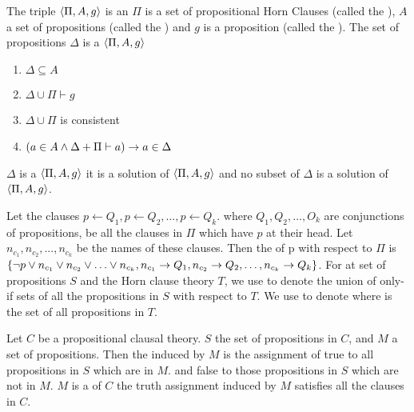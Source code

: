 \begin{defi}
The triple $\left\langle \Pi,A,g\right\rangle$ is an  \iffTx{} $\Pi$ is a set of propositional Horn Clauses (called the ), $A$ a set of propositions (called the ) and $g$ is a proposition (called the ). The set of propositions $\Delta$ is a  $\left\langle \Pi,A,g\right\rangle$ \iffTx{}
\begin{enumerate}
\item $\Delta\subseteq A$
\item $\Delta\cup\Pi\vdash g$
\item $\Delta\cup\Pi$ is consistent
\item $\left( a\in A \wedge \Delta+\Pi\vdash a\right)\rightarrow a\in\Delta$
\end{enumerate}
$\Delta$ is a  $\left\langle \Pi,A,g\right\rangle$ \iffTx{} it is a solution of $\left\langle \Pi,A,g\right\rangle$ and no subset of $\Delta$ is a solution of $\left\langle \Pi,A,g\right\rangle$.
\cite{conf/ijcai/Eshghi93}
\end{defi}

\begin{defi}
Let the clauses $p\leftarrow Q_1,p\leftarrow Q_2,\ldots,p\leftarrow Q_k$. where $Q_1,Q_2,\ldots,O_k$ are conjunctions of propositions, be all the clauses in $\Pi$ which have $p$ at their head. Let $n_{c_1},n_{c_2},...,n_{c_k}$ be the names of these clauses. Then the  of p with respect to $\Pi$ is $\left\{ \neg p\vee n_{c_1}\vee n_{c_2}\vee\ldots\vee n_{c_k},n_{c_1}\rightarrow Q_1,n_{c_2}\rightarrow Q_2,\ldots,n_{c_k}\rightarrow Q_k\right\}$. For at set of propositions $S$ and the Horn clause theory $T$, we use  to denote the union of only-if sets of all the propositions in $S$ with respect to $T$. We use  to denote  where  is the set of all propositions in $T$.
\cite{conf/ijcai/Eshghi93}
\end{defi}

\begin{defi}
Let $C$ be a propositional clausal theory. $S$ the set of propositions in $C$, and $M$ a set of propositions. Then the  induced by $M$ is the assignment of true to all propositions in $S$ which are in $M$. and false to those propositions in $S$ which are not in $M$. $M$ is a  of $C$ \iffTx{} the truth assignment induced by $M$ satisfies all the clauses in $C$.
\cite{conf/ijcai/Eshghi93}
\end{defi}

